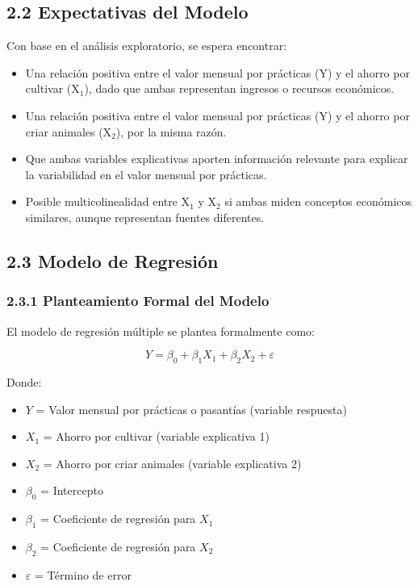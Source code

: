 \documentclass[12pt,a4paper]{article}
\begin{document}
\subsection*{2.2 Expectativas del Modelo}

Con base en el análisis exploratorio, se espera encontrar:
\begin{itemize}
    \item Una relación positiva entre el valor mensual por prácticas (Y) y el ahorro por cultivar (X$_1$), dado que ambas representan ingresos o recursos económicos.
    \item Una relación positiva entre el valor mensual por prácticas (Y) y el ahorro por criar animales (X$_2$), por la misma razón.
    \item Que ambas variables explicativas aporten información relevante para explicar la variabilidad en el valor mensual por prácticas.
    \item Posible multicolinealidad entre X$_1$ y X$_2$ si ambas miden conceptos económicos similares, aunque representan fuentes diferentes.
\end{itemize}

\subsection*{2.3 Modelo de Regresión}

\subsubsection*{2.3.1 Planteamiento Formal del Modelo}

El modelo de regresión múltiple se plantea formalmente como:

$$Y = \beta_0 + \beta_1 X_1 + \beta_2 X_2 + \varepsilon$$

Donde:
\begin{itemize}
    \item $Y$ = Valor mensual por prácticas o pasantías (variable respuesta)
    \item $X_1$ = Ahorro por cultivar (variable explicativa 1)
    \item $X_2$ = Ahorro por criar animales (variable explicativa 2)
    \item $\beta_0$ = Intercepto
    \item $\beta_1$ = Coeficiente de regresión para $X_1$
    \item $\beta_2$ = Coeficiente de regresión para $X_2$
    \item $\varepsilon$ = Término de error
\end{itemize}
\end{document}
